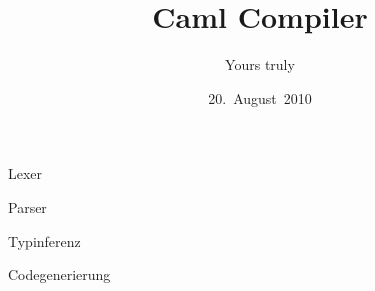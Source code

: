 \documentclass{beamer}
\title{Caml Compiler}
\author{Yours truly}
\institute{TU München}
\date{20.~August~2010}
\begin{document}
\frame{\titlepage}


\begin{frame}{Lexer}
\end{frame}

\begin{frame}{Parser}
\end{frame}

\begin{frame}{Typinferenz}
\end{frame}

\begin{frame}{Codegenerierung}
\end{frame}
\end{document}
